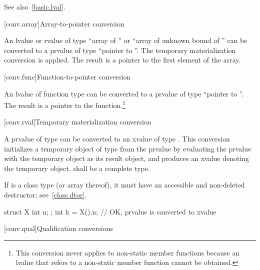 \pnum
\begin{note}
See also~\ref{basic.lval}.
\end{note}

[conv.array]{Array-to-pointer conversion}

\pnum
{}%
%
%
An lvalue or rvalue of type ``array of  '' or ``array
of unknown bound of '' can be converted to a prvalue of type
``pointer to ''.
The temporary materialization conversion is applied.
The result is a pointer to the first element of the array.

[conv.func]{Function-to-pointer conversion}

\pnum
{}%
An lvalue of function type  can be converted to a prvalue of
type ``pointer to ''. The result is a pointer to the
function.\footnote{This conversion never applies to non-static member functions because an
lvalue that refers to a non-static member function cannot be obtained.}

[conv.rval]{Temporary materialization conversion}
%

\pnum
A prvalue of type  can be converted to an xvalue of type .
This conversion initializes a temporary object of type  from the prvalue
by evaluating the prvalue with the temporary object as its result object,
and produces an xvalue denoting the temporary object.
 shall be a complete type.
\begin{note}
If  is a class type (or array thereof),
it must have an accessible and non-deleted destructor;
see~\ref{class.dtor}.
\end{note}
\begin{example}
\begin{codeblock}
struct X { int n; };
int k = X().n;      // OK,  prvalue is converted to xvalue
\end{codeblock}
\end{example}

[conv.qual]{Qualification conversions}


